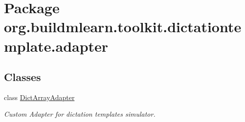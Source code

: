 \hypertarget{namespaceorg_1_1buildmlearn_1_1toolkit_1_1dictationtemplate_1_1adapter}{}\section{Package org.\+buildmlearn.\+toolkit.\+dictationtemplate.\+adapter}
\label{namespaceorg_1_1buildmlearn_1_1toolkit_1_1dictationtemplate_1_1adapter}
\subsection*{Classes}
\begin{DoxyCompactItemize}
\item 
class \hyperlink{classorg_1_1buildmlearn_1_1toolkit_1_1dictationtemplate_1_1adapter_1_1DictArrayAdapter}{Dict\+Array\+Adapter}
\begin{DoxyCompactList}\small\item\em Custom Adapter for dictation template\textquotesingle{}s simulator. \end{DoxyCompactList}\end{DoxyCompactItemize}
